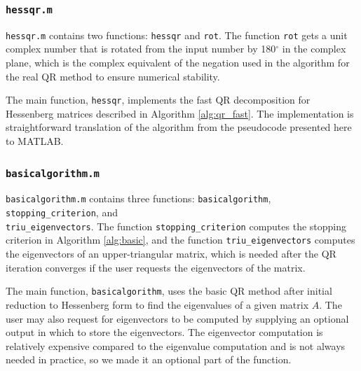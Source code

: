 \documentclass{article}
\begin{document}
\subsubsection*{\texttt{hessqr.m}}
\texttt{hessqr.m} contains two functions: \texttt{hessqr} and \texttt{rot}. The function \texttt{rot} gets a unit complex number that is rotated from the input number by 180$^\circ$ in the complex plane, which is the complex equivalent of the negation used in the algorithm for the real QR method to ensure numerical stability.

The main function, \texttt{hessqr}, implements the fast QR decomposition for Hessenberg matrices described in Algorithm \ref{alg:qr_fast}. The implementation is straightforward translation of the algorithm from the pseudocode presented here to MATLAB.

\subsubsection*{\texttt{basicalgorithm.m}}
\texttt{basicalgorithm.m} contains three functions: \texttt{basicalgorithm}, \texttt{stopping\_criterion}, and \\\texttt{triu\_eigenvectors}. The function \texttt{stopping\_criterion} computes the stopping criterion in Algorithm \ref{alg:basic}, and the function \texttt{triu\_eigenvectors} computes the eigenvectors of an upper-triangular matrix, which is needed after the QR iteration converges if the user requests the eigenvectors of the matrix.

The main function, \texttt{basicalgorithm}, uses the basic QR method after initial reduction to Hessenberg form to find the eigenvalues of a given matrix $A$. The user may also request for eigenvectors to be computed by supplying an optional output in which to store the eigenvectors. The eigenvector computation is relatively expensive compared to the eigenvalue computation and is not always needed in practice, so we made it an optional part of the function.

\end{document}
